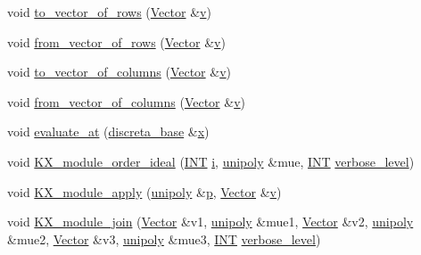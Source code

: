 \begin{DoxyCompactItemize}
\item 
void \mbox{\hyperlink{classmatrix_a46200f82b0e76394a82968029d5e5a61}{to\+\_\+vector\+\_\+of\+\_\+rows}} (\mbox{\hyperlink{class_vector}{Vector}} \&\mbox{\hyperlink{simeon_8_c_aeb3f3030944801b163bc3b829a7f6710}{v}})
\item 
void \mbox{\hyperlink{classmatrix_aeffa1035691fc1055ce1b52d2e31a114}{from\+\_\+vector\+\_\+of\+\_\+rows}} (\mbox{\hyperlink{class_vector}{Vector}} \&\mbox{\hyperlink{simeon_8_c_aeb3f3030944801b163bc3b829a7f6710}{v}})
\item 
void \mbox{\hyperlink{classmatrix_ab806288c2dcb40b77b2dfc53ab09f74d}{to\+\_\+vector\+\_\+of\+\_\+columns}} (\mbox{\hyperlink{class_vector}{Vector}} \&\mbox{\hyperlink{simeon_8_c_aeb3f3030944801b163bc3b829a7f6710}{v}})
\item 
void \mbox{\hyperlink{classmatrix_af666c6b895475348ffa818d0da96897b}{from\+\_\+vector\+\_\+of\+\_\+columns}} (\mbox{\hyperlink{class_vector}{Vector}} \&\mbox{\hyperlink{simeon_8_c_aeb3f3030944801b163bc3b829a7f6710}{v}})
\item 
void \mbox{\hyperlink{classmatrix_a0063caaa247f4546e31800f81e17a8cd}{evaluate\+\_\+at}} (\mbox{\hyperlink{classdiscreta__base}{discreta\+\_\+base}} \&\mbox{\hyperlink{alphabet2_8_c_a6150e0515f7202e2fb518f7206ed97dc}{x}})
\item 
void \mbox{\hyperlink{classmatrix_a69a80605be7914af5fd65e680944aeca}{K\+X\+\_\+module\+\_\+order\+\_\+ideal}} (\mbox{\hyperlink{galois_8h_a09fddde158a3a20bd2dcadb609de11dc}{I\+NT}} \mbox{\hyperlink{alphabet2_8_c_acb559820d9ca11295b4500f179ef6392}{i}}, \mbox{\hyperlink{classunipoly}{unipoly}} \&mue, \mbox{\hyperlink{galois_8h_a09fddde158a3a20bd2dcadb609de11dc}{I\+NT}} \mbox{\hyperlink{simeon_8_c_a818073fbcc2f439e7c56952f67386122}{verbose\+\_\+level}})
\item 
void \mbox{\hyperlink{classmatrix_accef670f4dfd666f9de32fe50754665d}{K\+X\+\_\+module\+\_\+apply}} (\mbox{\hyperlink{classunipoly}{unipoly}} \&\mbox{\hyperlink{alphabet2_8_c_a533391314665d6bf1b5575e9a9cd8552}{p}}, \mbox{\hyperlink{class_vector}{Vector}} \&\mbox{\hyperlink{simeon_8_c_aeb3f3030944801b163bc3b829a7f6710}{v}})
\item 
void \mbox{\hyperlink{classmatrix_afd55b3b44c36f039928862315f52428b}{K\+X\+\_\+module\+\_\+join}} (\mbox{\hyperlink{class_vector}{Vector}} \&v1, \mbox{\hyperlink{classunipoly}{unipoly}} \&mue1, \mbox{\hyperlink{class_vector}{Vector}} \&v2, \mbox{\hyperlink{classunipoly}{unipoly}} \&mue2, \mbox{\hyperlink{class_vector}{Vector}} \&v3, \mbox{\hyperlink{classunipoly}{unipoly}} \&mue3, \mbox{\hyperlink{galois_8h_a09fddde158a3a20bd2dcadb609de11dc}{I\+NT}} \mbox{\hyperlink{simeon_8_c_a818073fbcc2f439e7c56952f67386122}{verbose\+\_\+level}})

\end{DoxyCompactItemize}

